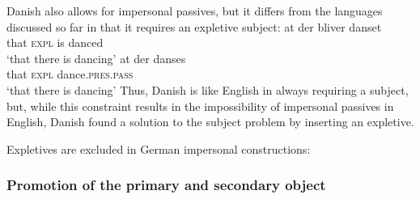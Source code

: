 \noindent
Danish also allows for impersonal passives, but it differs from the languages discussed so far in
that it requires an expletive subject:
\eal
\ex 
\gll at der bliver danset\\
     that \textsc{expl} is danced\\\danish
\glt `that there is dancing'
\ex
\gll at der danses\\
     that \textsc{expl} dance.\textsc{pres}.\textsc{pass}\\
\glt `that there is dancing'
\zl
Thus, Danish is like English in always requiring a subject, but, while this constraint results in the
impossibility of impersonal passives in English, Danish found a solution to the subject problem by
inserting an expletive.

Expletives are excluded in German impersonal constructions:
\nocite{MOe2011a}
\z
{}




\subsubsection{Promotion of the primary and secondary object}

